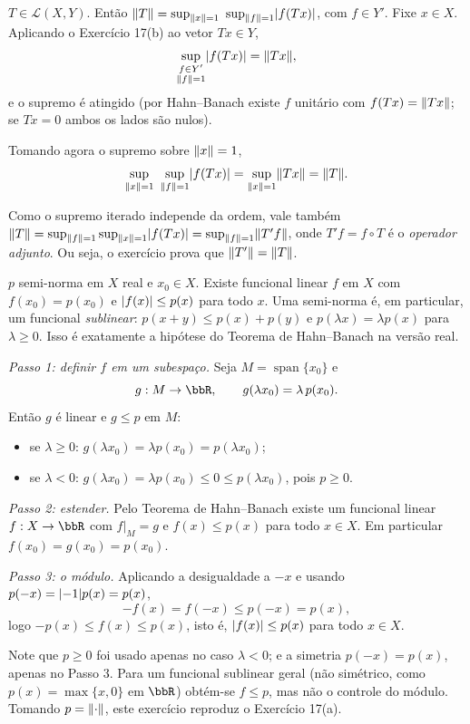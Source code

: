 \begin{exercicio}{$T\in\mathcal{L}(X,Y)$. Então $\norm{T}=\sup_{\norm{x}=1}\ \sup_{\norm{f}=1}\abs{f(Tx)}$, com $f\in Y'$.}
\sol
Fixe $x\in X$. Aplicando o Exercício 17(b) ao vetor $Tx\in Y$,
\[ \sup_{\substack{f\in Y'\\ \lVert f\rVert=1}}\lvert f(Tx)\rvert=\lVert Tx\rVert, \]
e o supremo é atingido (por Hahn--Banach existe $f$ unitário com $f(Tx)=\lVert Tx\rVert$; se $Tx=0$ ambos os lados são nulos).

Tomando agora o supremo sobre $\lVert x\rVert=1$,
\[ \sup_{\norm{x}=1}\ \sup_{\norm{f}=1}\abs{f(Tx)}=\sup_{\norm{x}=1}\norm{Tx}=\norm{T}. \]

\begin{obs}
Como o supremo iterado independe da ordem, vale também $\lVert T\rVert=\sup_{\lVert f\rVert=1}\sup_{\lVert x\rVert=1}\lvert f(Tx)\rvert=\sup_{\lVert f\rVert=1}\lVert T'f\rVert$, onde $T'f=f\circ T$ é o \emph{operador adjunto}. Ou seja, o exercício prova que $\lVert T'\rVert=\lVert T\rVert$.
\end{obs}
\end{exercicio}

\begin{exercicio}{$p$ semi-norma em $X$ real e $x_0\in X$. Existe funcional linear $f$ em $X$ com $f(x_0)=p(x_0)$ e $\lvert f(x)\rvert\le p(x)$ para todo $x$.}
\sol
Uma semi-norma é, em particular, um funcional \emph{sublinear}: $p(x+y)\le p(x)+p(y)$ e $p(\lambda x)=\lambda p(x)$ para $\lambda\ge0$. Isso é exatamente a hipótese do Teorema de Hahn--Banach na versão real.

\emph{Passo 1: definir $f$ em um subespaço.} Seja $M=\operatorname{span}\{x_0\}$ e
\[ g:M\to\R,\qquad g(\lambda x_0)=\lambda\,p(x_0). \]
Então $g$ é linear e $g\le p$ em $M$:
\begin{itemize}[leftmargin=1.4em,itemsep=1pt]
\item se $\lambda\ge0$: $g(\lambda x_0)=\lambda p(x_0)=p(\lambda x_0)$;
\item se $\lambda<0$: $g(\lambda x_0)=\lambda p(x_0)\le0\le p(\lambda x_0)$, pois $p\ge0$.
\end{itemize}

\emph{Passo 2: estender.} Pelo Teorema de Hahn--Banach existe um funcional linear $f:X\to\R$ com $f|_M=g$ e $f(x)\le p(x)$ para todo $x\in X$. Em particular $f(x_0)=g(x_0)=p(x_0)$.

\emph{Passo 3: o módulo.} Aplicando a desigualdade a $-x$ e usando $p(-x)=\lvert-1\rvert p(x)=p(x)$,
\[ -f(x)=f(-x)\le p(-x)=p(x), \]
logo $-p(x)\le f(x)\le p(x)$, isto é, $\lvert f(x)\rvert\le p(x)$ para todo $x\in X$.

\begin{obs}
Note que $p\ge0$ foi usado apenas no caso $\lambda<0$; e a simetria $p(-x)=p(x)$, apenas no Passo 3. Para um funcional sublinear geral (não simétrico, como $p(x)=\max\{x,0\}$ em $\R$) obtém-se $f\le p$, mas não o controle do módulo. Tomando $p=\lVert\cdot\rVert$, este exercício reproduz o Exercício 17(a).
\end{obs}
\end{exercicio}

